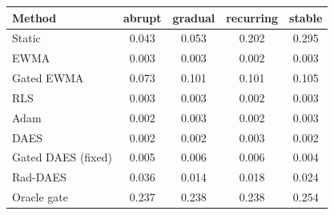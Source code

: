 \begin{tabular}{lcccc}
\toprule
Method & abrupt & gradual & recurring & stable \\
\midrule
Static & 0.043 & 0.053 & 0.202 & 0.295 \\
EWMA & 0.003 & 0.003 & 0.002 & 0.003 \\
Gated EWMA & 0.073 & 0.101 & 0.101 & 0.105 \\
RLS & 0.003 & 0.003 & 0.002 & 0.003 \\
Adam & 0.002 & 0.003 & 0.002 & 0.003 \\
DAES & 0.002 & 0.002 & 0.003 & 0.002 \\
Gated DAES (fixed) & 0.005 & 0.006 & 0.006 & 0.004 \\
Rad-DAES & 0.036 & 0.014 & 0.018 & 0.024 \\
Oracle gate & 0.237 & 0.238 & 0.238 & 0.254 \\
\bottomrule
\end{tabular}
